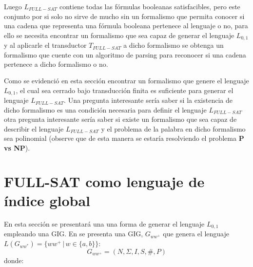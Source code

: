 \documentclass{article}
\begin{document}
Luego $L_{FULL-SAT}$ contiene todas las fórmulas booleanas satisfacibles, pero este conjunto por si solo no sirve de mucho sin un formalismo
que permita conocer si una cadena que representa una fórmula booleana pertenece al lenguaje o no, para ello se necesita encontrar un formalismo que sea capaz
de generar el lenguaje $L_{0,1}$ y al aplicarle el transductor $T_{FULL-SAT}$ a dicho formalismo se obtenga un formalismo que cuente con un algoritmo de parsing
para reconocer si una cadena pertenece a dicho formalismo o no.

Como se evidenció en esta sección encontrar un formalismo que genere el lenguaje $L_{0,1}$, el cual sea cerrado bajo transducción finita
es suficiente para generar el lenguaje $L_{FULL-SAT}$. Una pregunta interesante sería saber si la existencia de dicho formalismo
es una condición necesaria para definir el lenguaje $L_{FULL-SAT}$ otra pregunta interesante sería saber si existe un formalismo
que sea capaz de describir el lenguaje $L_{FULL-SAT}$ y el problema de la palabra en dicho formalismo sea polinomial (observe que de esta manera
se estaría resolviendo el problema \textbf{P vs NP}).

\section{FULL-SAT como lenguaje de índice global}

En esta sección se presentará una una forma de generar el lenguaje $L_{0,1}$ empleando una GIG. En \cite{globalIndexLanguages} se presenta
una GIG, $G_{ww^+}$ que genera el lenguaje $L(G_{ww^*})=\{ww^+\,|\,w\in\{a,b\}\}$: 
$$
    G_{ww^+} = (N, \Sigma, I, S, \#, P) 
$$
donde:
\end{document}
